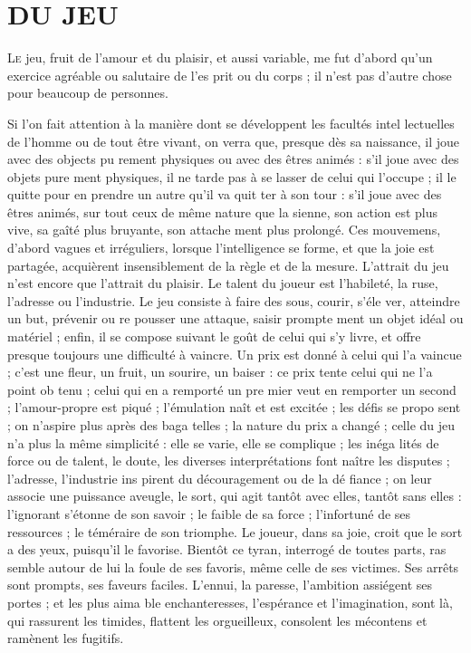\chapter{DU JEU}

\lettrine{L}{e} jeu, fruit de l'amour et du plaisir,
et aussi variable, me fut d'abord qu'un
exercice agréable ou salutaire de l'es%
prit ou du corps ; il n'est pas d'autre
chose pour beaucoup de personnes.

Si l'on fait attention à la manière
dont se développent les facultés intel%
lectuelles de l'homme ou de tout être
vivant, on verra que, presque dès sa
naissance, il joue avec des objects pu%
rement physiques ou avec des êtres
animés : s'il joue avec des objets pure%
ment physiques, il ne tarde pas à se
lasser de celui qui l'occupe ; il le quitte
pour en prendre un autre qu'il va quit%
ter à son tour : s'il joue avec des êtres
animés, sur tout ceux de même nature
que la sienne, son action est plus vive,
sa gaîté plus bruyante, son attache%
ment plus prolongé. Ces mouvemens,
d'abord vagues et irréguliers, lorsque
l'intelligence se forme, et que la joie est
partagée, acquièrent insensiblement
de la règle et de la mesure. L'attrait du
jeu n'est encore que l'attrait du plaisir.
Le talent du joueur est l'habileté, la
ruse, l'adresse ou l'industrie. Le jeu
consiste à faire des sous, courir, s'éle%
ver, atteindre un but, prévenir ou re%
pousser une attaque, saisir prompte%
ment un objet idéal ou matériel ; enfin,
il se compose suivant le goût de celui
qui s'y livre, et offre presque toujours
une difficulté à vaincre. Un prix est
donné à celui qui l'a vaincue ; c'est une
fleur, un fruit, un sourire, un baiser :
ce prix tente celui qui ne l'a point ob%
tenu ; celui qui en a remporté un pre%
mier veut en remporter un second ;
l'amour-propre est piqué ; l'émulation
naît et est excitée ; les défis se propo%
sent ; on n'aspire plus après des baga%
telles ; la nature du prix a changé ; celle
du jeu n'a plus la même simplicité : elle
se varie, elle se complique ; les inéga%
lités de force ou de talent, le doute,
les diverses interprétations font naître
les disputes ; l'adresse, l'industrie ins%
pirent du découragement ou de la dé%
fiance ; on leur associe une puissance
aveugle, le sort, qui agit tantôt avec
elles, tantôt sans elles : l'ignorant
s'étonne de son savoir ; le faible de sa
force ; l'infortuné de ses ressources ; le
téméraire de son triomphe. Le joueur,
dans sa joie, croit que le sort a des
yeux, puisqu'il le favorise. Bientôt ce
tyran, interrogé de toutes parts, ras%
semble autour de lui la foule de ses
favoris, même celle de ses victimes.
Ses arrêts sont prompts, ses faveurs
faciles. L'ennui, la paresse, l'ambition
assiégent ses portes ; et les plus aima%
ble enchanteresses, l'espérance et
l'imagination, sont là, qui rassurent
les timides, flattent les orgueilleux,
consolent les mécontens et ramènent 
les fugitifs.

